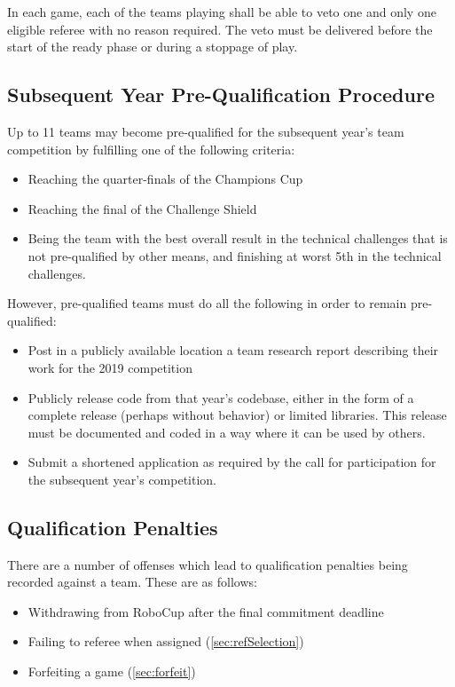 In each game, each of the teams playing shall be able to veto one and only one eligible referee with no reason required. The veto must be delivered before the start of the ready phase or during a stoppage of play.


\subsection{Subsequent Year Pre-Qualification Procedure}
\label{sec:preQual}
Up to 11 teams may become pre-qualified for the subsequent year's team competition by fulfilling one of the following criteria:
\begin{itemize}
    \item Reaching the quarter-finals of the Champions Cup
    \item Reaching the final of the Challenge Shield
    \item Being the team with the best overall result in the technical challenges that is not pre-qualified by other means, and finishing at worst 5th in the technical challenges.
\end{itemize}

However, pre-qualified teams must do all the following in order to remain pre-qualified:
\begin{itemize}
\item Post in a publicly available location a team research report describing their work for the 2019 competition
\item Publicly release code from that year's codebase, either in the form of a complete release (perhaps without behavior) or limited libraries.  This release must be documented and coded in a way where it can be used by others.
\item Submit a shortened application as required by the call for participation for the subsequent year's competition.
\end{itemize}

\subsection{Qualification Penalties}
\label{sec:qualificationPenalties}

There are a number of offenses which lead to qualification penalties being recorded against a team. These are as follows:
\begin{itemize}
    \item Withdrawing from RoboCup after the final commitment deadline
    \item Failing to referee when assigned (\cref{sec:refSelection})
    \item Forfeiting a game (\cref{sec:forfeit})
\end{itemize}

